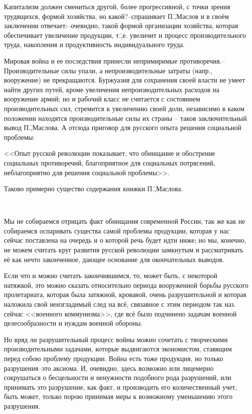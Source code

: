 Капитализм должен смениться другой, более прогрессивной, с точки зрения трудящихся, формой хозяйства, но какой?\---спрашивает П.\=,Маслов и в своём заключении отвечает:\---очевидно, такой формой организации хозяйства, которая обеспечивает увеличение продукции, т.\=,е. увеличит и процесс производительного труда, накопления и продуктивность индивидуального труда.

Мировая война и ее последствия принесли непримиримые противоречия.\---Производительные силы упали, а непроизводительные затраты (напр., вооружение) не прекращаются. Буржуазия для сохранения своей власти не умеет найти других путей, кроме увеличения непроизводительных расходов на вооружение армий; но и рабочий класс не считается с состоянием производительных сил, стремится к увеличению своей доли, независимо в каком положении находятся производительные силы их страны \--- таков заключительный вывод П.\=,Маслова. А отсюда приговор для русского опыта решения социальной проблемы:

<<Опыт русской революции показывает, что обнищание и обострение социальных противоречий, благоприятное для социальных потрясений, неблагоприятно для решения социальной проблемы>>.

Таково примерно существо содержания книжки П.\=,Маслова.

\begin{center}
 \noindent\textasteriskcentered\ \textasteriskcentered\ \textasteriskcentered
\end{center}

Мы не собираемся отрицать факт обнищания современной России, так же как не собираемся оспаривать существа самой проблемы продукции, которая у нас сейчас поставлена на очередь и о которой речь будет идти ниже; но мы, конечно, не можем считать круг развития русской революции замкнутым и рассматривать её как нечто законченное, дающее основание для окончательных выводов.

Если что и можно считать закончившимся, то, может быть, с некоторой натяжкой, это можно сказать относительно периода вооруженной борьбы русского пролетариата, которая была затяжной, кровавой, очень разрушительной и которая наложила свой неизгладимый след на всё, связавное с этим периодом так наз. сейчас <<военного коммунизма>>, где всё было подчинено задачам военной целесообразности и нуждам военной обороны.

Но вряд ли разрушительный процесс войны можно сочетать с творческими производительными задачами, которые выдвигаются экономистом, ставящим перед собою проблему продукции. Война есть тоже продукция, но только разрушения\---это аксиома. И, очевидно, здесь возможно или лицемерно сокрушаться о бесцельности и ненужности подобного рода разрушений, или принимать это разрушение, как факт, и производить его количественный учет, быть может, только порою принимая меры к возможному уменьшению этого разрушения.

